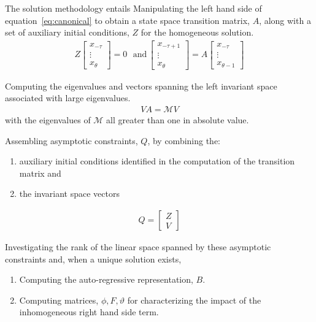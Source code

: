 \documentclass[tikz]{beamer}
\begin{document}
\begin{frame}
The solution methodology entails 
Manipulating the left hand side of equation~\ref{eq:canonical} to obtain
 a state space transition matrix, $A$, along with
a set of auxiliary initial conditions, $Z$ for the homogeneous solution.
\begin{gather}
  Z
  \begin{bmatrix}
    x_{-\tau}\\ \vdots \\ x_{\theta}
  \end{bmatrix}=0 \,\,\,\,\text{and}\,   \begin{bmatrix}
    x_{-\tau+1}\\ \vdots \\ x_{\theta}
  \end{bmatrix}
=A   \begin{bmatrix}
    x_{-\tau}\\ \vdots \\ x_{\theta-1}
  \end{bmatrix}
\end{gather}

\end{frame}
\begin{frame}


 Computing the eigenvalues and vectors spanning 
the left invariant space associated with
large eigenvalues. 
\begin{gather}
 V A =   \mathcal{M}  V 
\end{gather}
with the eigenvalues of $ \mathcal{M}$ all greater than one in absolute value.

\end{frame}
\begin{frame}


 Assembling asymptotic
constraints, $Q$,   by combining the:
  \begin{enumerate}
\item  auxiliary initial conditions identified in the computation of the transition matrix and 
\item the invariant space vectors
  \end{enumerate}
\begin{gather}
  Q= 
  \begin{bmatrix}
    Z\\V
  \end{bmatrix}
\end{gather}

\end{frame}
\begin{frame}
 Investigating the rank of the linear space spanned by these asymptotic
constraints and,  when a unique solution exists, 
\begin{enumerate}
\item Computing the auto-regressive 
representation, $B$. 
\item Computing matrices, $\phi, F, \vartheta$ 
for characterizing the impact of the inhomogeneous
right hand side term.

\end{enumerate}
\end{frame}
\end{document}
